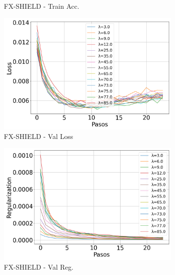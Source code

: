 \begin{figure}[H]
\begin{subfigure}[b]{0.3\textwidth}
        \caption{FX-SHIELD - Train Acc.}
    \end{subfigure}

    \vspace{0.5em}

    \begin{subfigure}[b]{0.3\textwidth}
        \includegraphics[width=\linewidth]{images/Val_Loss_evolucion_fxshield.png}
        \caption{FX-SHIELD - Val Loss}
    \end{subfigure}
    \hfill
    \begin{subfigure}[b]{0.3\textwidth}
        \includegraphics[width=\linewidth]{images/Val_Regularization_evolucion_fxshield.png}
        \caption{FX-SHIELD - Val Reg.}
    \end{subfigure}
    \hfill
    \begin{subfigure}[b]{0.3\textwidth}

\end{subfigure}
\end{figure}
